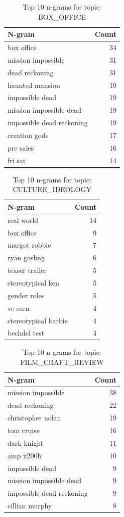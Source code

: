 \begin{table}[h]
\centering
\caption{Top 10 n-grams for topic: BOX_OFFICE}
\begin{tabular}{lr}
\hline
N-gram & Count \\
\hline
box office & 34 \\
mission impossible & 31 \\
dead reckoning & 31 \\
haunted mansion & 19 \\
impossible dead & 19 \\
mission impossible dead & 19 \\
impossible dead reckoning & 19 \\
creation gods & 17 \\
pre sales & 16 \\
fri sat & 14 \\
\hline
\end{tabular}
\end{table}

\begin{table}[h]
\centering
\caption{Top 10 n-grams for topic: CULTURE_IDEOLOGY}
\begin{tabular}{lr}
\hline
N-gram & Count \\
\hline
real world & 14 \\
box office & 9 \\
margot robbie & 7 \\
ryan gosling & 6 \\
teaser trailer & 5 \\
stereotypical ken & 5 \\
gender roles & 5 \\
ve seen & 4 \\
stereotypical barbie & 4 \\
bechdel test & 4 \\
\hline
\end{tabular}
\end{table}

\begin{table}[h]
\centering
\caption{Top 10 n-grams for topic: FILM_CRAFT_REVIEW}
\begin{tabular}{lr}
\hline
N-gram & Count \\
\hline
mission impossible & 38 \\
dead reckoning & 22 \\
christopher nolan & 19 \\
tom cruise & 16 \\
dark knight & 11 \\
amp x200b & 10 \\
impossible dead & 9 \\
mission impossible dead & 9 \\
impossible dead reckoning & 9 \\
cillian murphy & 8 \\
\hline
\end{tabular}
\end{table}


